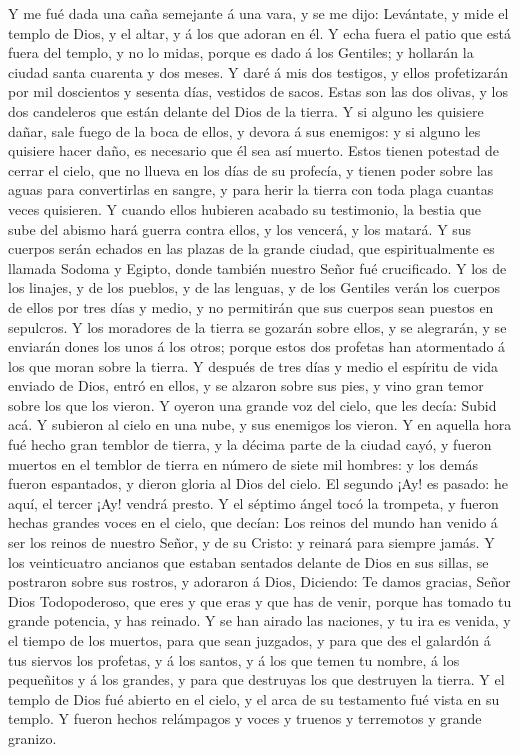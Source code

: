  Y me fué dada una caña semejante á una vara, y se me dijo:
Levántate, y mide el templo de Dios, y el altar, y á los que adoran en
él.  Y echa fuera el patio que está fuera del templo, y no
lo midas, porque es dado á los Gentiles; y hollarán la ciudad santa
cuarenta y dos meses.  Y daré á mis dos testigos, y ellos
profetizarán por mil doscientos y sesenta días, vestidos de sacos.
 Estas son las dos olivas, y los dos candeleros que están
delante del Dios de la tierra.  Y si alguno les quisiere
dañar, sale fuego de la boca de ellos, y devora á sus enemigos: y si
alguno les quisiere hacer daño, es necesario que él sea así muerto.
 Estos tienen potestad de cerrar el cielo, que no llueva en
los días de su profecía, y tienen poder sobre las aguas para
convertirlas en sangre, y para herir la tierra con toda plaga cuantas
veces quisieren.  Y cuando ellos hubieren acabado su
testimonio, la bestia que sube del abismo hará guerra contra ellos, y
los vencerá, y los matará.  Y sus cuerpos serán echados en
las plazas de la grande ciudad, que espiritualmente es llamada Sodoma y
Egipto, donde también nuestro Señor fué crucificado.  Y los
de los linajes, y de los pueblos, y de las lenguas, y de los Gentiles
verán los cuerpos de ellos por tres días y medio, y no permitirán que
sus cuerpos sean puestos en sepulcros.  Y los moradores de
la tierra se gozarán sobre ellos, y se alegrarán, y se enviarán dones
los unos á los otros; porque estos dos profetas han atormentado á los
que moran sobre la tierra.  Y después de tres días y medio
el espíritu de vida enviado de Dios, entró en ellos, y se alzaron sobre
sus pies, y vino gran temor sobre los que los vieron.  Y
oyeron una grande voz del cielo, que les decía: Subid acá. Y subieron al
cielo en una nube, y sus enemigos los vieron.  Y en aquella
hora fué hecho gran temblor de tierra, y la décima parte de la ciudad
cayó, y fueron muertos en el temblor de tierra en número de siete mil
hombres: y los demás fueron espantados, y dieron gloria al Dios del
cielo.  El segundo ¡Ay! es pasado: he aquí, el tercer ¡Ay!
vendrá presto.  Y el séptimo ángel tocó la trompeta, y
fueron hechas grandes voces en el cielo, que decían: Los reinos del
mundo han venido á ser los reinos de nuestro Señor, y de su Cristo: y
reinará para siempre jamás.  Y los veinticuatro ancianos
que estaban sentados delante de Dios en sus sillas, se postraron sobre
sus rostros, y adoraron á Dios,  Diciendo: Te damos
gracias, Señor Dios Todopoderoso, que eres y que eras y que has de
venir, porque has tomado tu grande potencia, y has reinado.
 Y se han airado las naciones, y tu ira es venida, y el
tiempo de los muertos, para que sean juzgados, y para que des el
galardón á tus siervos los profetas, y á los santos, y á los que temen
tu nombre, á los pequeñitos y á los grandes, y para que destruyas los
que destruyen la tierra.  Y el templo de Dios fué abierto
en el cielo, y el arca de su testamento fué vista en su templo. Y fueron
hechos relámpagos y voces y truenos y terremotos y grande granizo.

